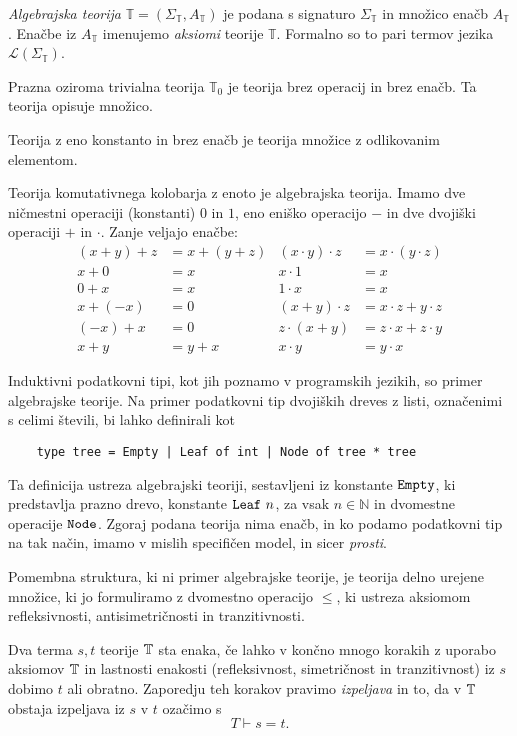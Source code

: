 \documentclass[../kategoricna_logika.tex]{subfiles}
\begin{document}
%
\begin{definicija}
  \emph{Algebrajska teorija}
  $\mathbb{T} = (\Sigma_\mathbb{T}, A_\mathbb{T})$ je podana s signaturo
  $\Sigma_\mathbb{T}$ in množico enačb $A_\mathbb{T}$.
  Enačbe iz $A_{\mathbb{T}}$ imenujemo \emph{aksiomi} teorije $\mathbb{T}$. Formalno so
  to pari termov jezika $\mathcal{L}(\Sigma_{\mathbb{T}})$.
\end{definicija}
\begin{primer}
  Prazna oziroma trivialna teorija $\mathbb{T}_0$ je teorija brez operacij in brez enačb.
  Ta teorija opisuje množico.
\end{primer}
\begin{primer}
Teorija z eno konstanto in brez enačb je teorija množice z odlikovanim elementom.
\end{primer}
\begin{primer}
  Teorija komutativnega kolobarja z enoto je algebrajska teorija.
  Imamo dve ničmestni operaciji (konstanti) $0$ in $1$, eno eniško operacijo
  $-$ in dve dvojiški operaciji $+$ in $\cdot$. Zanje veljajo enačbe:
\begin{align*}
  (x+y)+z &= x + (y + z) & (x \cdot y) \cdot z &= x \cdot (y \cdot z) \\
  x + 0 &= x & x \cdot 1 &= x \\
  0 + x &= x & 1\cdot x &= x \\
  x + (-x) &= 0 & (x+y)\cdot z &= x \cdot z + y\cdot z \\
  (-x) + x &= 0 & z \cdot (x+y) &= z \cdot x+ z\cdot y \\
  x + y &= y + x & x \cdot y &= y\cdot x
\end{align*}
\end{primer}
\begin{primer}
  Induktivni podatkovni tipi, kot jih poznamo v programskih jezikih, so primer algebrajske teorije.
  Na primer podatkovni tip dvojiških dreves z listi, označenimi s celimi števili,
  bi lahko definirali kot
  \begin{verbatim}
    type tree = Empty | Leaf of int | Node of tree * tree
  \end{verbatim}
  Ta definicija ustreza algebrajski teoriji, sestavljeni iz konstante $\verb|Empty|$,
  ki predstavlja prazno drevo, konstante $\verb|Leaf| \  n$, za vsak $n \in \mathbb{N}$
  in dvomestne operacije $\verb|Node|$. Zgoraj podana teorija nima enačb, in ko podamo
  podatkovni tip na tak način, imamo v mislih specifičen model, in sicer \emph{prosti}.
\end{primer}
\begin{primer}
  Pomembna struktura, ki ni primer algebrajske teorije, je teorija delno urejene množice,
  ki jo formuliramo z dvomestno operacijo $\leq$, ki ustreza aksiomom refleksivnosti,
  antisimetričnosti in tranzitivnosti.
\end{primer}
%
\begin{definicija}
  Dva terma $s, t$ teorije $\mathbb{T}$ sta enaka,
  če lahko v končno mnogo korakih z uporabo aksiomov $\mathbb{T}$ in lastnosti enakosti
  (refleksivnost, simetričnost in tranzitivnost) iz $s$ dobimo $t$ ali obratno.
  Zaporedju teh korakov pravimo \emph{izpeljava} in to, da v $\mathbb{T}$ obstaja izpeljava
  iz $s$ v $t$ ozačimo s
  \[ T \vdash s = t.\]
\end{definicija}
%
\end{document}
